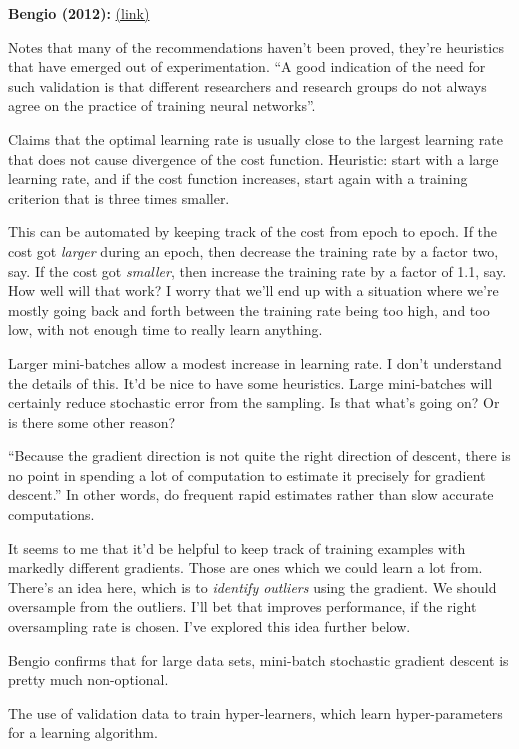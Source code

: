 \documentclass[12pt]{article}
\newcommand{\link}[2]{\href{#1}{#2}}
\begin{document}
\textbf{Bengio (2012):} \link{http://arxiv.org/abs/1206.5533}{(link)}

Notes that many of the recommendations haven't been proved, they're
heuristics that have emerged out of experimentation.  ``A good
indication of the need for such validation is that different
researchers and research groups do not always agree on the practice of
training neural networks''.

Claims that the optimal learning rate is usually close to the largest
learning rate that does not cause divergence of the cost function.
Heuristic: start with a large learning rate, and if the cost function
increases, start again with a training criterion that is three times
smaller.

This can be automated by keeping track of the cost from epoch to
epoch.  If the cost got \emph{larger} during an epoch, then decrease
the training rate by a factor two, say.  If the cost got
\emph{smaller}, then increase the training rate by a factor of 1.1,
say.  How well will that work?  I worry that we'll end up with a
situation where we're mostly going back and forth between the training
rate being too high, and too low, with not enough time to really learn
anything.

Larger mini-batches allow a modest increase in learning rate.  I don't
understand the details of this.  It'd be nice to have some heuristics.
Large mini-batches will certainly reduce stochastic error from the
sampling.  Is that what's going on?  Or is there some other reason?

``Because the gradient direction is not quite the right direction of
descent, there is no point in spending a lot of computation to
estimate it precisely for gradient descent.''  In other words, do
frequent rapid estimates rather than slow accurate computations.

It seems to me that it'd be helpful to keep track of training examples
with markedly different gradients.  Those are ones which we could
learn a lot from.  There's an idea here, which is to \emph{identify
  outliers} using the gradient.  We should oversample from the
outliers.  I'll bet that improves performance, if the right
oversampling rate is chosen.  I've explored this idea further below.

Bengio confirms that for large data sets, mini-batch stochastic
gradient descent is pretty much non-optional.

The use of validation data to train hyper-learners, which learn
hyper-parameters for a learning algorithm.
\end{document}
